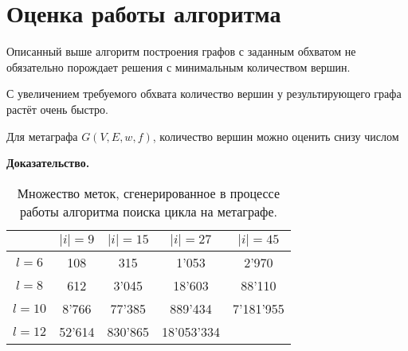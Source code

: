 \documentclass[14pt]{mmcs-article}
\begin{document}

\section{Оценка работы алгоритма}

Описанный выше алгоритм построения графов с заданным обхватом не обязательно порождает решения с минимальным количеством вершин.


С увеличением требуемого обхвата количество вершин у результирующего графа растёт очень быстро.

Для метаграфа $G(V, E, w, f)$, количество вершин можно оценить снизу числом $  $ %

\textbf{Доказательство.}




\begin{table}[H]
    \centering
    \begin{tabular}{ | c | c | c | c | c | }
        \hline
                   & $|i| = 9$         & $|i| = 15$        & $|i| = 27$      & $|i| = 45$  \\ \hline
        $ l = 6 $  & 108               & 315               & 1'053           & 2'970       \\ \hline
        $ l = 8 $  & 612               & 3'045             & 18'603          & 88'110      \\ \hline
        $ l = 10 $ & 8'766             & 77'385            & 889'434         & 7'181'955   \\ \hline
        $ l = 12 $ & 52'614            & 830'865           & 18'053'334      &             \\ \hline
    \end{tabular}
    \caption{ Множество меток, сгенерированное в процессе работы алгоритма поиска цикла на метаграфе. }
    \label{cycle_search_table}
\end{table}
\end{document}
